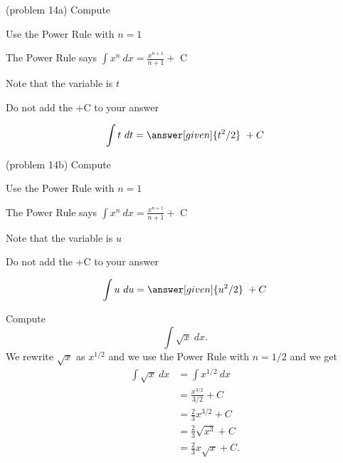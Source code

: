 \documentclass{ximera}
\begin{document}
\begin{problem}(problem 14a)
Compute 

\begin{hint}
Use the Power Rule with $n=1$
\end{hint}
\begin{hint}
The Power Rule says $\int x^n \ dx = \frac{x^{n+1}}{n+1} +$ C
\end{hint}
\begin{hint}
Note that the variable is $t$
\end{hint}
\begin{hint}
\begin{center}
Do not add the +C to your answer
\end{center}
\end{hint}

\[
\int t \ dt =
\answer[given]{t^2 /2} \ + C
\]
\end{problem}



\begin{problem}(problem 14b)
Compute 

\begin{hint}
Use the Power Rule with $n=1$
\end{hint}
\begin{hint}
The Power Rule says $\int x^n \ dx = \frac{x^{n+1}}{n+1} +$ C
\end{hint}
\begin{hint}
Note that the variable is $u$
\end{hint}
\begin{hint}
\begin{center}
Do not add the +C to your answer
\end{center}
\end{hint}

\[
\int u \ du =
\answer[given]{u^2 /2} \ + C
\]
\end{problem}


\begin{example}[example 15]
Compute $$\int \sqrt x \ dx.$$
We rewrite $\sqrt x$ as $x^{1/2}$ and we use the Power Rule with $n= 1/2$ and we get
\begin{align*}
\int \sqrt x \ dx &= \int x^{1/2} \ dx\\
&= \frac{x^{3/2}}{3/2} + C\\
&= \tfrac{2}{3}x^{3/2} + C\\ 
&= \tfrac23 \sqrt {x^3} + C\\
&= \tfrac23 x\sqrt {x} + C.
\end{align*}
\end{example}
\end{document}
